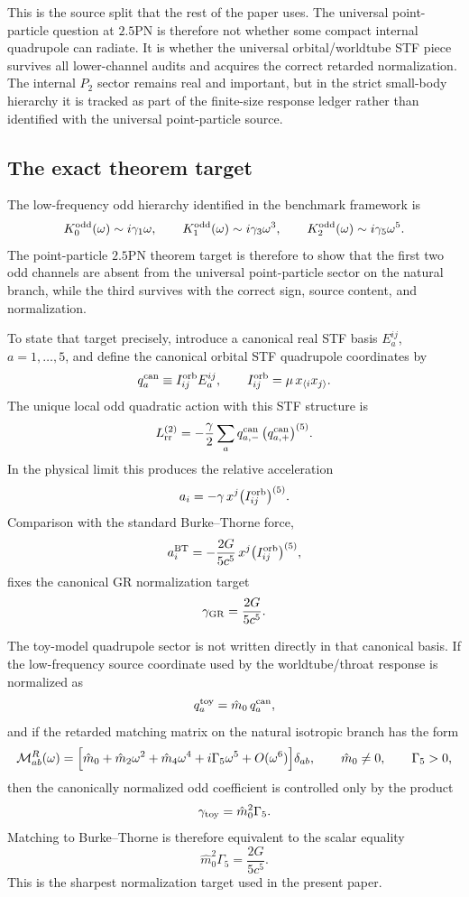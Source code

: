 \documentclass[11pt]{article}
\begin{document}
This is the source split that the rest of the paper uses.  The universal point-particle
question at $2.5$PN is therefore not whether some compact internal quadrupole can radiate.
It is whether the universal orbital/worldtube STF piece survives all lower-channel audits
and acquires the correct retarded normalization.  The internal $P_2$ sector remains real
and important, but in the strict small-body hierarchy it is tracked as part of the
finite-size response ledger rather than identified with the universal point-particle source.

\subsection{The exact theorem target}
\label{sec:dictionary-target-theorem}

The low-frequency odd hierarchy identified in the benchmark framework is
\[
K_0^{\rm odd}(\omega)\sim i\gamma_1\omega,
\qquad
K_1^{\rm odd}(\omega)\sim i\gamma_3\omega^3,
\qquad
K_2^{\rm odd}(\omega)\sim i\gamma_5\omega^5.
\]
The point-particle $2.5$PN theorem target is therefore to show that the first two odd
channels are absent from the universal point-particle sector on the natural branch, while
the third survives with the correct sign, source content, and normalization.

To state that target precisely, introduce a canonical real STF basis $E_a^{ij}$,
$a=1,\dots,5$, and define the canonical orbital STF quadrupole coordinates by
\[
q_a^{\rm can}\equiv I_{ij}^{\rm orb}E_a^{ij},
\qquad
I_{ij}^{\rm orb}=\mu\,x_{\langle i}x_{j\rangle}.
\]
The unique local odd quadratic action with this STF structure is
\[
L_{\rm rr}^{(2)}
=
-\frac{\gamma}{2}\sum_a q_{a,-}^{\rm can}\,\bigl(q_{a,+}^{\rm can}\bigr)^{(5)}.
\]
In the physical limit this produces the relative acceleration
\[
a_i=-\gamma\,x^j\bigl(I_{ij}^{\rm orb}\bigr)^{(5)}.
\]
Comparison with the standard Burke--Thorne force,
\[
a_i^{\rm BT}=-\frac{2G}{5c^5}\,x^j\bigl(I_{ij}^{\rm orb}\bigr)^{(5)},
\]
fixes the canonical GR normalization target
\[
\gamma_{\rm GR}=\frac{2G}{5c^5}.
\]

The toy-model quadrupole sector is not written directly in that canonical basis.  If the
low-frequency source coordinate used by the worldtube/throat response is normalized as
\[
q_a^{\rm toy}=\hat m_0\,q_a^{\rm can},
\]
and if the retarded matching matrix on the natural isotropic branch has the form
\[
\mathcal M_{ab}^R(\omega)
=
\Bigl[\hat m_0+\hat m_2\omega^2+\hat m_4\omega^4+i\Gamma_5\omega^5+O(\omega^6)\Bigr]\delta_{ab},
\qquad
\hat m_0\neq 0,
\qquad
\Gamma_5>0,
\]
then the canonically normalized odd coefficient is controlled only by the product
\[
\gamma_{\rm toy}=\hat m_0^2\Gamma_5.
\]
Matching to Burke--Thorne is therefore equivalent to the scalar equality
\[
\boxed{
\hat m_0^2\Gamma_5=\frac{2G}{5c^5}.
}
\]
This is the sharpest normalization target used in the present paper.
\end{document}
